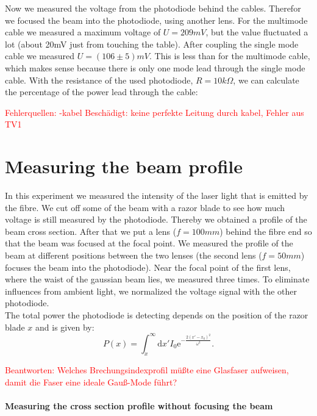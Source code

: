 \documentclass{article}
\begin{document}
Now we measured the voltage from the photodiode behind the cables. Therefor we focused the beam into the photodiode, using another lens. For the multimode cable we measured a maximum voltage of $U=209mV$, but the value fluctuated a lot (about 20mV just from touching the table). After coupling the single mode cable we measured $U=(106 \pm 5)mV$. This is less than for the multimode cable, which makes sense because there is only one mode lead through the single mode cable. With the resistance of the used photodiode, $R = 10k\Omega$, we can calculate the percentage of the power lead through the cable:

\textcolor{red}{Fehlerquellen:
-kabel Beschädigt: keine perfekte Leitung durch kabel, Fehler aus TV1}

\section{Measuring the beam profile}

In this experiment we measured the intensity of the laser light that is emitted by the fibre. We cut off some of the beam with a razor blade to see how much voltage is still measured by the photodiode. Thereby we obtained a profile of the beam cross section. After that we put a lens ($f=100mm$) behind the fibre end so that the beam was focused at the focal point. We measured the profile of the beam at different positions between the two lenses (the second lens ($f=50mm$) focuses the beam into the photodiode). Near the focal point of the first lens, where the waist of the gaussian beam lies, we measured three times. To eliminate influences from ambient light, we normalized the voltage signal with the other photodiode.\\

The total power the photodiode is detecting depends on the position of the razor blade $x$ and is given by:
\begin{equation}
P(x) = \int_x^\infty\mathrm{d}x' I_0 \mathrm{e}^{-\frac{2(x'-x_0)^2}{\omega^2}}.
\end{equation}

\textcolor{red}{Beantworten: Welches Brechungsindexprofil müßte eine Glasfaser aufweisen, damit die Faser eine ideale Gauß-Mode führt?}

\paragraph{Measuring the cross section profile without focusing the beam}
\end{document}
